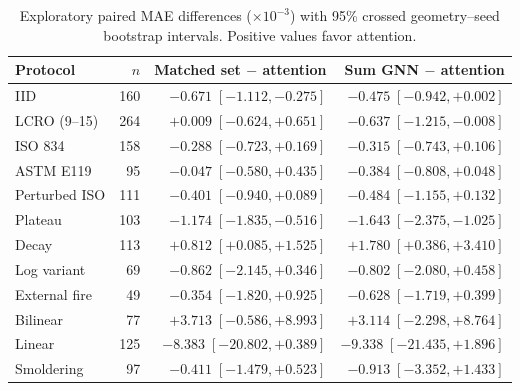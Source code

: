 \begin{table}[t]
\centering\small
\caption{Exploratory paired MAE differences ($\times10^{-3}$) with 95\% crossed geometry--seed bootstrap intervals. Positive values favor attention.}
\label{tab:exploratory_attention_effects}
\begin{tabular}{lrrr}
\toprule
Protocol & $n$ & Matched set $-$ attention & Sum GNN $-$ attention \\
\midrule
IID & 160 & $-0.671\;[-1.112, -0.275]$ & $-0.475\;[-0.942, +0.002]$ \\
LCRO (9--15) & 264 & $+0.009\;[-0.624, +0.651]$ & $-0.637\;[-1.215, -0.008]$ \\
\midrule
ISO 834 & 158 & $-0.288\;[-0.723, +0.169]$ & $-0.315\;[-0.743, +0.106]$ \\
ASTM E119 & 95 & $-0.047\;[-0.580, +0.435]$ & $-0.384\;[-0.808, +0.048]$ \\
Perturbed ISO & 111 & $-0.401\;[-0.940, +0.089]$ & $-0.484\;[-1.155, +0.132]$ \\
Plateau & 103 & $-1.174\;[-1.835, -0.516]$ & $-1.643\;[-2.375, -1.025]$ \\
Decay & 113 & $+0.812\;[+0.085, +1.525]$ & $+1.780\;[+0.386, +3.410]$ \\
Log variant & 69 & $-0.862\;[-2.145, +0.346]$ & $-0.802\;[-2.080, +0.458]$ \\
External fire & 49 & $-0.354\;[-1.820, +0.925]$ & $-0.628\;[-1.719, +0.399]$ \\
Bilinear & 77 & $+3.713\;[-0.586, +8.993]$ & $+3.114\;[-2.298, +8.764]$ \\
Linear & 125 & $-8.383\;[-20.802, +0.389]$ & $-9.338\;[-21.435, +1.896]$ \\
Smoldering & 97 & $-0.411\;[-1.479, +0.523]$ & $-0.913\;[-3.352, +1.433]$ \\
\bottomrule
\end{tabular}
\end{table}
